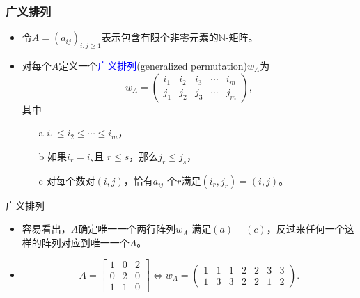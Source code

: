 \documentclass{beamer}
\newcommand{\blue}{\textcolor{blue}}
\begin{document}
%
%
%

%



\begin{frame}\frametitle{广义排列}
\begin{itemize}
\item 令$A=(a_{ij})_{i,j\geq
	1}$表示包含有限个非零元素的$\mathbb{N}$-矩阵。

\pause  
\item 对每个$A$定义一个\blue{广义排列}(generalized permutation)$w_A$为
$$
w_A=\begin{pmatrix} i_1 & i_2 & i_3 & \cdots & i_m\\
j_1 & j_2 & j_3 & \cdots & j_m
\end{pmatrix},
$$
其中
\begin{itemize}
	\item[a] $i_1\leq i_2\leq \cdots \leq i_m$，
	\item[b] 如果$i_r=i_s$且
	$r\leq s$，那么$j_r\leq j_s$，
	\item[c] 对每个数对$(i,j)$，恰有$a_{ij}$
	个$r$满足$(i_r,j_r)=(i,j)$。
\end{itemize}
\end{itemize}
\end{frame}

\begin{frame}{广义排列}
\begin{itemize}
\item 容易看出，$A$确定唯一一个两行阵列$w_A$
满足$(a)-(c)$，反过来任何一个这样的阵列对应到唯一一个$A$。

\pause \item
$$A=\left[\begin{array}{ccc} 1 & 0 & 2\\
0 & 2 & 0\\
1 & 1 & 0
\end{array}\right] \Leftrightarrow  w_A=\begin{pmatrix} 1 & 1 & 1 & 2 & 2 & 3 & 3\\
1 & 3 & 3 & 2 & 2 & 1 & 2
\end{pmatrix}.
$$
\end{itemize}
\end{frame}
\end{document}

